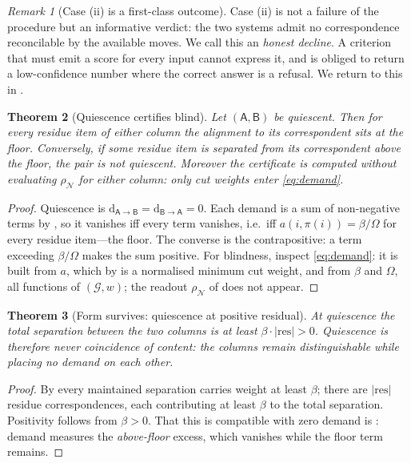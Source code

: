 \documentclass[11pt,twocolumn,a4paper]{article}
\newtheorem{theorem}{Theorem}[section]
\theoremstyle{definition}
\theoremstyle{remark}
\newtheorem{remark}[theorem]{Remark}
\newcommand{\Gph}{\mathcal{G}}
\newcommand{\wt}{w}
\newcommand{\flo}{\beta}
\newcommand{\dem}{\mathrm{d}}
\newcommand{\al}{a}
\newcommand{\colA}{\mathsf{A}}
\newcommand{\colB}{\mathsf{B}}
\newcommand{\resid}{\mathrm{res}}
\newcommand{\netw}{\mathcal{N}}
\begin{document}
\begin{remark}[Case (ii) is a first-class outcome]
\label{rem:decline}
Case (ii) is not a failure of the procedure but an informative verdict: the
two systems admit no correspondence reconcilable by the available moves.
We call this an \emph{honest decline}. A criterion that must emit a score
for every input cannot express it, and is obliged to return a
low-confidence number where the correct answer is a refusal. We return to
this in .
\end{remark}

\begin{theorem}[Quiescence certifies blind]
\label{thm:quiescence}
Let $(\colA,\colB)$ be quiescent. Then for every residue item of either
column the alignment to its correspondent sits at the floor. Conversely,
if some residue item is separated from its correspondent above the floor,
the pair is not quiescent. Moreover the certificate is computed without
evaluating $\rho_\netw$ for either column: only cut weights enter
\eqref{eq:demand}.
\end{theorem}

\begin{proof}
Quiescence is $\dem_{\colA\to\colB}=\dem_{\colB\to\colA}=0$. Each demand
is a sum of non-negative terms by , so it vanishes iff
every term vanishes, i.e.\ iff $\al(i,\pi(i))=\flo/\Omega$ for every
residue item---the floor. The converse is the contrapositive: a term
exceeding $\flo/\Omega$ makes the sum positive. For blindness, inspect
\eqref{eq:demand}: it is built from $\al$, which by
 is a normalised minimum cut weight, and from $\flo$
and $\Omega$, all functions of $(\Gph,\wt)$; the readout $\rho_\netw$ of
 does not appear.
\end{proof}

\begin{theorem}[Form survives: quiescence at positive residual]
\label{thm:form}
At quiescence the total separation between the two columns is at least
$\flo\cdot|\resid|>0$. Quiescence is therefore never coincidence of
content: the columns remain distinguishable while placing no demand on
each other.
\end{theorem}

\begin{proof}
By  every maintained separation carries weight at least
$\flo$; there are $|\resid|$ residue correspondences, each contributing at
least $\flo$ to the total separation. Positivity follows from
$\flo>0$. That this is compatible with zero demand is
: demand measures the \emph{above-floor} excess,
which vanishes while the floor term remains.
\end{proof}
\end{document}
